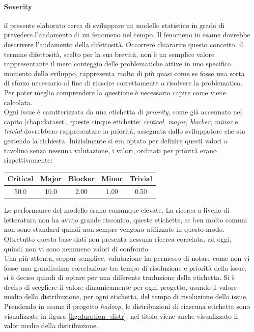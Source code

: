 \documentclass[%
    corpo=12pt,
    twoside,
    oldstyle,
    autoretitolo,
    greek,
    evenboxes,
]{toptesi}
\begin{document}
\paragraph{Severity} il presente elaborato cerca di sviluppare un modello statistico in grado di prevedere l'andamento di un fenomeno nel tempo. Il fenomeno in esame dovrebbe descrivere l'andamento della difettosità. Occorrere chiararire questo concetto, il termine difettosità, scelto per la sua brevità, non è un semplice valore rappresentante il mero conteggio delle problematiche attive in uno specifico momento dello sviluppo, rappresenta molto di più quasi come se fosse una sorta di sforzo necessario al fine di riuscire correttamente a risolvere la problematica. Per poter meglio comprendere la questione è necessario capire come viene calcolata.\\
Ogni issue è caratterizzata da una etichetta di \textit{priority}, come già accennato nel capito \ref{chap:dataset}, queste cinque etichette: \textit{critical}, \textit{major}, \textit{blocker}, \textit{minor} e \textit{trivial} dovrebbero rappresentare la priorità, assegnata dallo sviluppatore che sta gestendo la richiesta. Inizialmente si era optato per definire questi valori a tavolino senza nessuna valutazione, i valori, ordinati per priorità erano rispettivamente:
\begin{center}
   \label{tab:priority}
  \begin{tabular}{ |c|c|c|c|c| }
     \hline
     \textbf{Critical} & \textbf{Major} & \textbf{Blocker} & \textbf{Minor} & \textbf{Trivial} \\
     \hline
     \hline
     50.0 & 10.0 & 2.00 & 1.00 & 0.50 \\
     \hline
  \end{tabular}
\end{center}
Le performance del modello erano comunque elevate. La ricerca a livello di letteratura non ha avuto grande riscontro, queste etichette, se ben molto comuni non sono standard quindi non sempre vengono utilizzate in questo modo. Oltretutto questa base dati non presenta nessuna ricerca correlata, ad oggi, quindi non vi sono nemmeno valori di confronto.\\
Una più attenta, seppur semplice, valutazione ha permesso di notare come non vi fosse una grandissima correlazione tra tempo di risoluzione e priorità della issue, si è deciso quindi di optare per una differente traduzione della etichetta. Si è deciso di scegliere il valore dinamicamente per ogni progetto, usando il valore medio della distribuzione, per ogni etichetta, del tempo di risoluzione della issue. Prendendo in esame il progetto \textit{hadoop}, le distribuzioni di ciascuna etichetta sono visualizzate in figura \ref{fig:duration_distr}, nel titolo viene anche visualizzato il valor medio della distribuzione.
\end{document}
